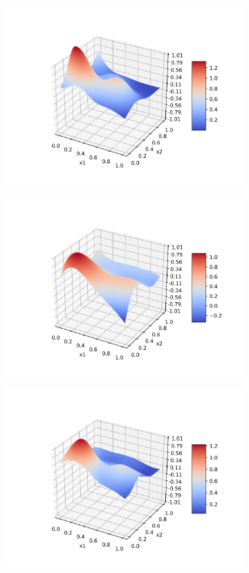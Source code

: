 \documentclass[a4paper]{article}
\numberwithin{equation}{section} %
\numberwithin{figure}{section} %
\numberwithin{table}{section} %
\theoremstyle{definition}
\begin{document}
\begin{figure}[H]
\begin{subfigure}{.32\textwidth}
		\includegraphics[width=1.0\linewidth]{images/RBFN_N_50_sigma_025_rho_00001.png}
	\end{subfigure}
	\begin{subfigure}{.32\textwidth}
		\centering
		\includegraphics[width=1.0\linewidth]{images/MLP_Extreme_Learning.png}
	\end{subfigure}
	\begin{subfigure}{.32\textwidth}
		\centering
		\includegraphics[width=1.0\linewidth]{images/RBFN_Extreme_Learning.png}

\end{subfigure}
\end{figure}
\end{document}

